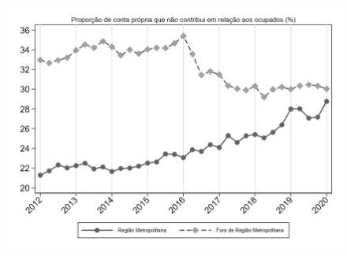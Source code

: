 \begin{frame}[label=_composicao_demografica_regiao_metro_prop_cpropriaNc]{}
\textit{\hyperlink{_composicao_demografica_regiao_metro}{}}
\begin{figure}
  \centering
  \includegraphics[width=1.0\linewidth]{../../analysis/output/composicao_demografica/area_geografica/_composicao_demografica_regiao_metro_prop_cpropriaNc.png}
  \caption{}
  \label{fig:_composicao_demografica_regiao_metro_prop_cpropriaNc}
\end{figure}
\end{frame}